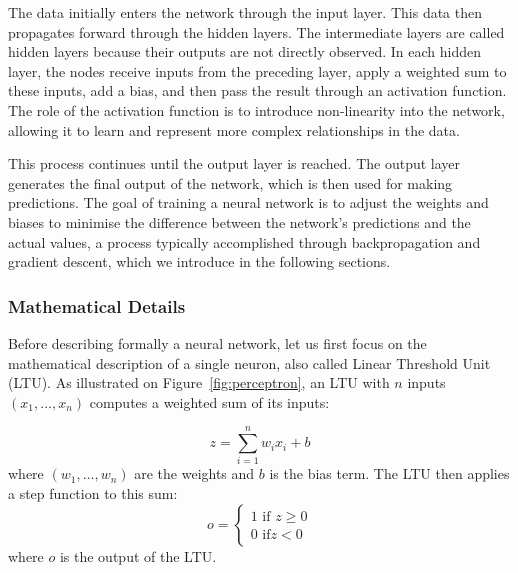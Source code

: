 The data initially enters the network through the input layer. This data then propagates forward through the hidden layers. The intermediate layers are called hidden layers because their outputs are not directly observed. In each hidden layer, the nodes receive inputs from the preceding layer, apply a weighted sum to these inputs, add a bias, and then pass the result through an activation function. The role of the activation function is to introduce non-linearity into the network, allowing it to learn and represent more complex relationships in the data.

This process continues until the output layer is reached. The output layer generates the final output of the network, which is then used for making predictions. The goal of training a neural network is to adjust the weights and biases to minimise the difference between the network's predictions and the actual values, a process typically accomplished through backpropagation and gradient descent, which we introduce in the following sections.



\subsubsection{Mathematical Details}
Before describing formally a neural network, let us first focus on the mathematical description of a single neuron, also called Linear Threshold Unit (LTU). As illustrated on Figure~\ref{fig:perceptron}, an LTU with $n$ inputs $(x_1, \dots, x_n)$ computes a weighted sum of its inputs:

\begin{equation}
    \label{eq:post-synaptic-pot}
    z = \sum_{i=1}^{n} w_i x_i + b
\end{equation}
where $(w_1, \dots, w_n)$ are the weights and $b$ is the bias term. The LTU then applies a step function to this sum:
\begin{equation}
    \label{eq:perceptron-io}
    o = 
    \begin{cases}
    1 \text{  if } z \geq 0 \\
    0 \text{  if}  z < 0
    \end{cases}
\end{equation}where $o$ is the output of the LTU.




